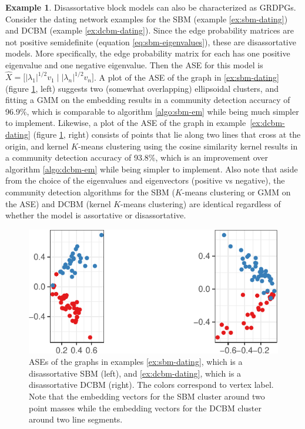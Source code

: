 \documentclass[
  12pt,
]{article}
\theoremstyle{definition}
\theoremstyle{definition}
\newtheorem{example}{Example}[section]
\theoremstyle{definition}
\theoremstyle{definition}
\theoremstyle{remark}
\begin{document}
\begin{example}
Disassortative block models can also be characterized as GRDPGs. 
Consider the dating network examples for the SBM (example \ref{ex:sbm-dating}) and DCBM (example \ref{ex:dcbm-dating}). 
Since the edge probability matrices are not positive semidefinite (equation \ref{eq:sbm-eigenvalues}), these are disassortative models. 
More specifically, the edge probability matrix for each has one positive eigenvalue and one negative eigenvalue. 
Then the ASE for this model is $\hat{X} = \Big[ |\lambda_1|^{1/2} v_1 \mid |\lambda_n|^{1/2} v_n \Big]$. 
A plot of the ASE of the graph in \ref{ex:sbm-dating} (figure \ref{fig:dating-ase}, left) suggests two (somewhat overlapping) ellipsoidal clusters, and fitting a GMM on the embedding results in a community detection accuracy of 96.9\%, which is comparable to algorithm \ref{algo:sbm-em} while being much simpler to implement. 
Likewise, a plot of the ASE of the graph in example~\ref{ex:dcbm-dating} (figure \ref{fig:dating-ase}, right) consists of points that lie along two lines that cross at the origin, and kernel $K$-means clustering using the cosine similarity kernel results in a community detection accuracy of 93.8\%, which is an improvement over algorithm \ref{algo:dcbm-em} while being simpler to implement. 
Also note that aside from the choice of the eigenvalues and eigenvectors (positive vs negative), the community detection algorithms for the SBM ($K$-means clustering or GMM on the ASE) and DCBM (kernel $K$-means clustering) are identical regardless of whether the model is assortative or disassortative. 

\begin{figure}[H]

{\centering \includegraphics{draft_files/figure-latex/dating-ase-1} 

}

\caption{ASEs of the graphs in examples \ref{ex:sbm-dating}, which is a disassortative SBM (left), and \ref{ex:dcbm-dating}, which is a disassortative DCBM (right). The colors correspond to vertex label. Note that the embedding vectors for the SBM cluster around two point masses while the embedding vectors for the DCBM cluster around two line segments.}\label{fig:dating-ase}
\end{figure}
\end{example}
\end{document}
